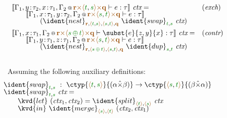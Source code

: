 \begin{figure*}[!t]
\begin{equation*}
\begin{array}{ll}
\\[0.5em]
\sem{\coctx{\Gamma_1,y\!:\!\tau_2,x\!:\!\tau_1,\Gamma_2}{\aclrd{\textbf{r}} 
        \atimes \alift{\cclrd{t},\cclrd{s}} \atimes \aclrd{\textbf{q}}} \vdash e : \tau}~\ctx = & (\emph{exch})\\[-0.25em]
  \hspace{2em}  \sem{\coctx{\Gamma_1,x\!:\!\tau_1,y\!:\!\tau_2,\Gamma_2}
     {\aclrd{\textbf{r}} \atimes \alift{\cclrd{s},\cclrd{t}} \atimes \aclrd{\textbf{q}}} \vdash e : \tau}\\[-0.25em]
  \hspace{4em}  (\ident{nest}_{\aclrd{\textbf{r}}, \alift{\cclrd{t},\cclrd{s}}, 
     \alift{\cclrd{s},\cclrd{t}}, \aclrd{\textbf{q}}}~\ident{swap}_{\cclrd{t},\cclrd{s}}~\ctx)
\\[0.5em]
\sem{\coctx{\Gamma_1,x\!:\!\tau_1,\Gamma_2}{\aclrd{\textbf{r}} 
        \atimes \alift{\cclrd{s} \,\cpar\, \cclrd{t}} \atimes \aclrd{\textbf{q}}} \vdash \subst{e}{z,y}{x} : \tau}~\ctx = & (\emph{contr})\\[-0.25em]
  \hspace{2em}  \sem{\coctx{\Gamma_1,y\!:\!\tau_1,z\!:\!\tau_1,\Gamma_2}
      {\aclrd{\textbf{r}} \atimes \alift{\cclrd{s},\cclrd{t}} \atimes \aclrd{\textbf{q}}} \vdash e : \tau}\\[-0.25em]
  \hspace{4em}  (\ident{nest}_{\aclrd{\textbf{r}}, \alift{\cclrd{s}\,\cpar\,\cclrd{t}}, 
      \alift{\cclrd{s},\cclrd{t}}, \aclrd{\textbf{q}}}~\ident{dup}_{\cclrd{s}, \cclrd{t}}~\ctx)
\end{array}
\end{equation*}
\\[0.5em]
{\small Assuming the following auxiliary definitions:}
\begin{equation*}
\hspace{-2em}
\begin{array}{l}
 \ident{swap}_{\cclrd{t},\cclrd{s}} ~:~ 
  \ctyp{\alift{\cclrd{t}, \cclrd{s}}}{(\alpha \xtimes \beta)} \rightarrow \ctyp{\alift{\cclrd{s}, \cclrd{t}}}{(\beta \xtimes \alpha)} \\[-0.25em]
\ident{swap}_{\cclrd{t},\cclrd{s}}~\ctx = \\
  \hspace{2em} \kvd{let}~(\ctx_1, \ctx_2) = \ident{split}_{\alift{\cclrd{t}}, \alift{\cclrd{s}}}~\ctx \\[-0.25em]
  \hspace{2em} \kvd{in}~\ident{merge}_{\alift{\cclrd{s}}, \alift{\cclrd{t}}}~(\ctx_2, \ctx_1)
 \\[0.5em]

\end{array}
\end{equation*}
\end{figure*}
